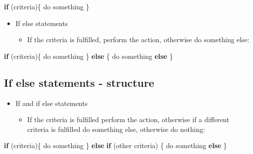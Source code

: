 \documentclass[]{article}
\newenvironment{Shaded}{\begin{snugshade}}{\end{snugshade}}
\newcommand{\ControlFlowTok}[1]{\textcolor[rgb]{0.13,0.29,0.53}{\textbf{#1}}}
\newcommand{\NormalTok}[1]{#1}
\providecommand{\tightlist}{%
  \setlength{\itemsep}{0pt}\setlength{\parskip}{0pt}}
\begin{document}
\begin{Shaded}
\begin{Highlighting}[]
\ControlFlowTok{if}\NormalTok{ (criteria)\{}
\NormalTok{  do something}
\NormalTok{\}}
\end{Highlighting}
\end{Shaded}

\begin{itemize}
\tightlist
\item
  If else statements

  \begin{itemize}
  \tightlist
  \item
    If the criteria is fulfilled, perform the action, otherwise do
    something else:
  \end{itemize}
\end{itemize}

\begin{Shaded}
\begin{Highlighting}[]
\ControlFlowTok{if}\NormalTok{ (criteria)\{}
\NormalTok{  do something}
\NormalTok{\} }\ControlFlowTok{else}\NormalTok{ \{}
\NormalTok{  do something }\ControlFlowTok{else}
\NormalTok{\}}
\end{Highlighting}
\end{Shaded}

\subsection{If else statements -
structure}\label{if-else-statements---structure-1}

\begin{itemize}
\tightlist
\item
  If and if else statements

  \begin{itemize}
  \tightlist
  \item
    If the criteria is fulfilled perform the action, otherwise if a
    different criteria is fulfilled do something else, otherwise do
    nothing:
  \end{itemize}
\end{itemize}

\begin{Shaded}
\begin{Highlighting}[]
\ControlFlowTok{if}\NormalTok{ (criteria)\{}
\NormalTok{  do something}
\NormalTok{\} }\ControlFlowTok{else} \ControlFlowTok{if}\NormalTok{ (other criteria) \{}
\NormalTok{  do something }\ControlFlowTok{else}
\NormalTok{\}}
\end{Highlighting}
\end{Shaded}
\end{document}
